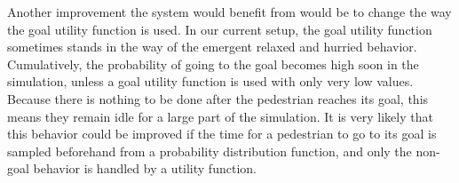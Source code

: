 \documentclass[11pt, a4paper]{book}
\begin{document}
Another improvement the system would benefit from would be to change the way the goal utility function is used. In our current setup, the goal utility function sometimes stands in the way of the emergent relaxed and hurried behavior. Cumulatively, the probability of going to the goal becomes high soon in the simulation, unless a goal utility function is used with only very low values. Because there is nothing to be done after the pedestrian reaches its goal, this means they remain idle for a large part of the simulation. It is very likely that this behavior could be improved if the time for a pedestrian to go to its goal is sampled beforehand from a probability distribution function, and only the non-goal behavior is handled by a utility function.


%
%
%
\end{document}
